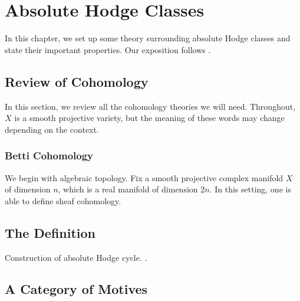 \documentclass[../thesis.tex]{subfiles}
\begin{document}
\chapter{Absolute Hodge Classes} %
In this chapter, we set up some theory surrounding absolute Hodge classes and state their important properties. Our exposition follows \cite{deligne-hodge}.

\section{Review of Cohomology} \label{sec:review-cohom}
In this section, we review all the cohomology theories we will need. Throughout, $X$ is a smooth projective variety, but the meaning of these words may change depending on the context.

\subsection{Betti Cohomology}
We begin with algebraic topology. Fix a smooth projective complex manifold $X$ of dimension $n$, which is a real manifold of dimension $2n$. In this setting, one is able to define sheaf cohomology.


\section{The Definition}
\begin{theorem}[Deligne] \label{thm:hodge-to-abs-hodge}
	
\end{theorem}
\begin{theorem}[Principle B] \label{thm:principle-b}
	
\end{theorem}
\begin{proposition} \label{prop:construct-abs-hodge}
	Construction of absolute Hodge cycle. \cite[Proposition~7.1]{deligne-hodge}.
\end{proposition}

\section{A Category of Motives}
\end{document}
